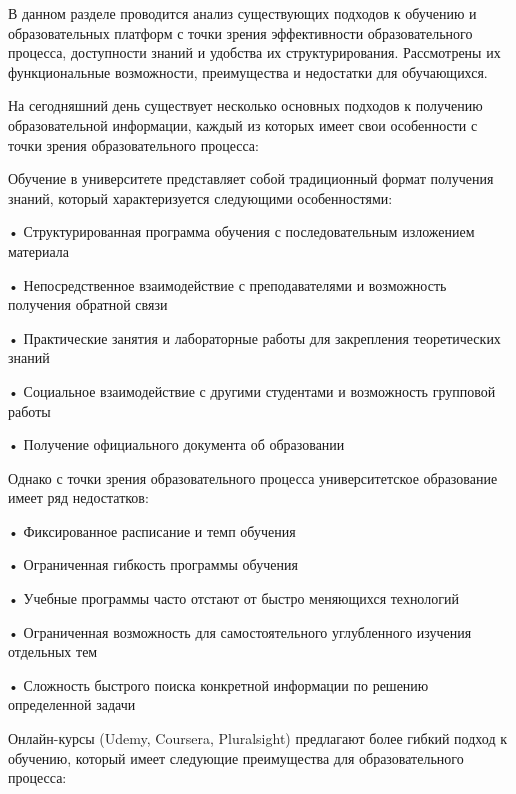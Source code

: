 {\gostFont

  \par \redline В данном разделе проводится анализ существующих подходов к обучению и образовательных платформ с точки зрения эффективности образовательного процесса, доступности знаний и удобства их структурирования. Рассмотрены их функциональные возможности, преимущества и недостатки для обучающихся.

  \par \redline На сегодняшний день существует несколько основных подходов к получению образовательной информации, каждый из которых имеет свои особенности с точки зрения образовательного процесса:

  \par \redline Обучение в университете представляет собой традиционный формат получения знаний, который характеризуется следующими особенностями:
  
  \par \redline • Структурированная программа обучения с последовательным изложением материала
  \par \redline • Непосредственное взаимодействие с преподавателями и возможность получения обратной связи
  \par \redline • Практические занятия и лабораторные работы для закрепления теоретических знаний
  \par \redline • Социальное взаимодействие с другими студентами и возможность групповой работы
  \par \redline • Получение официального документа об образовании
  
  \par \redline Однако с точки зрения образовательного процесса университетское образование имеет ряд недостатков:
  
  \par \redline • Фиксированное расписание и темп обучения
  \par \redline • Ограниченная гибкость программы обучения
  \par \redline • Учебные программы часто отстают от быстро меняющихся технологий
  \par \redline • Ограниченная возможность для самостоятельного углубленного изучения отдельных тем
  \par \redline • Сложность быстрого поиска конкретной информации по решению определенной задачи

  \par \redline Онлайн-курсы (Udemy, Coursera, Pluralsight) предлагают более гибкий подход к обучению, который имеет следующие преимущества для образовательного процесса:
  
}
